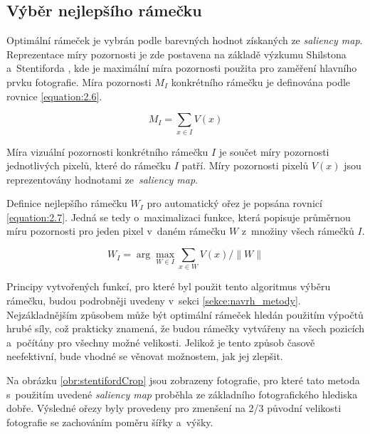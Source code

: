 \subsection{Výběr nejlepšího rámečku}
Optimální rámeček je vybrán podle barevných hodnot získaných ze \emph{saliency map}. Reprezentace míry pozornosti je zde postavena na základě výzkumu Shilstona a~Stentiforda \cite{Shilston2006}, kde je maximální míra pozornosti použita pro zaměření hlavního prvku fotografie. Míra pozornosti $M_I$ konkrétního rámečku je definována podle rovnice \ref{equation:2.6}. 

\begin{equation} \label{equation:2.6}
M_I = \sum_{x \in I} V(x)
\end{equation}

Míra vizuální pozornosti konkrétního rámečku $I$ je součet míry pozornosti jednotlivých pixelů, které do rámečku $I$ patří. Míry pozornosti pixelů $V(x)$ jsou reprezentovány hodnotami ze~\emph{saliency map}.

Definice nejlepšího rámečku $W_I$ pro automatický ořez je popsána rovnicí \ref{equation:2.7}. Jedná se tedy o~maximalizaci funkce, která popisuje průměrnou míru pozornosti pro jeden pixel v~daném rámečku $W$ z~množiny všech rámečků $I$.

\begin{equation} \label{equation:2.7}
W_I = \arg\max_{W \in I} \sum_{x \in W} V(x)/\lVert{W}\rVert
\end{equation}

Principy vytvořených funkcí, pro které byl použit tento algoritmus výběru rámečku, budou podrobněji uvedeny v~sekci \ref{sekce:navrh_metody}. Nejzákladnějším způsobem může být optimální rámeček hledán použitím výpočtů hrubé síly, což prakticky znamená, že budou rámečky vytvářeny na všech pozicích a~počítány pro všechny možné velikosti. Jelikož je tento způsob časově neefektivní, bude vhodné se věnovat možnostem, jak jej zlepšit.

Na obrázku \ref{obr:stentifordCrop} jsou zobrazeny fotografie, pro které tato metoda s~použitím uvedené \emph{saliency map} proběhla ze základního fotografického hlediska dobře. Výsledné ořezy byly provedeny pro zmenšení na 2/3 původní velikosti fotografie se zachováním poměru šířky a~výšky.

